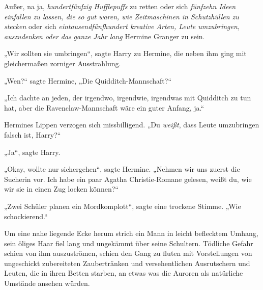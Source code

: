 Außer, na ja, \emph{hundertfünfzig Hufflepuffs} zu retten oder sich \emph{fünfzehn Ideen einfallen zu lassen, die so gut waren, wie Zeitmaschinen in Schutzhüllen zu stecken} oder sich \emph{eintausendfünfhundert kreative Arten, Leute umzubringen, auszudenken oder das} \emph{ganze Jahr lang} Hermine Granger zu sein.

„Wir sollten sie umbringen“, sagte Harry zu Hermine, die neben ihm ging mit gleichermaßen zorniger Ausstrahlung.

„Wen?“ sagte Hermine, „Die Quidditch-Mannschaft?“

„Ich dachte an jeden, der irgendwo, irgendwie, irgendwas mit Quidditch zu tun hat, aber die Ravenclaw-Mannschaft wäre ein guter Anfang, ja.“

Hermines Lippen verzogen sich missbilligend. „Du \emph{weißt}, dass Leute umzubringen falsch ist, Harry?“

„Ja“, sagte Harry.

„Okay, wollte nur sichergehen“, sagte Hermine. „Nehmen wir uns zuerst die Sucherin vor. Ich habe ein paar Agatha Christie-Romane gelesen, weißt du, wie wir sie in einen Zug locken können?“

„Zwei Schüler planen ein Mordkomplott“, sagte eine trockene Stimme. „Wie schockierend.“

Um eine nahe liegende Ecke herum strich ein Mann in leicht beflecktem Umhang, sein öliges Haar fiel lang und ungekämmt über seine Schultern. Tödliche Gefahr schien von ihm auszuströmen, schien den Gang zu fluten mit Vorstellungen von ungeschickt zubereiteten Zaubertränken und versehentlichen Ausrutschern und Leuten, die in ihren Betten starben, an etwas was die Auroren als natürliche Umstände ansehen würden.

